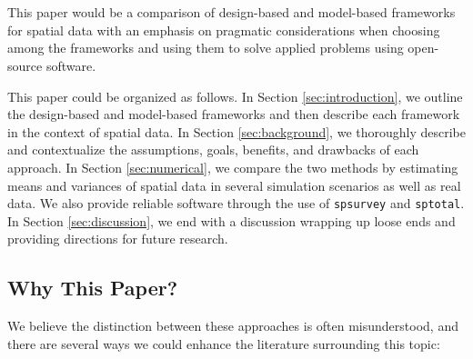 




\maketitle

\linenumbers

\clearpage

% 

\clearpage

\section*{}

This paper would be a comparison of design-based and model-based frameworks for spatial data with an emphasis on pragmatic considerations when choosing among the frameworks and using them to solve applied problems using open-source software.

This paper could be organized as follows. In Section \ref{sec:introduction}, we outline the design-based and model-based frameworks and then describe each framework in the context of spatial data. In Section \ref{sec:background}, we thoroughly describe and contextualize the assumptions, goals, benefits, and drawbacks of each approach. In Section \ref{sec:numerical}, we compare the two methods by estimating means and variances of spatial data in several simulation scenarios as well as real data. We also provide reliable software through the use of \texttt{spsurvey} and \texttt{sptotal}. In Section \ref{sec:discussion}, we end with a discussion wrapping up loose ends and providing directions for future research.

\subsection*{Why This Paper?}

We believe the distinction between these approaches is often misunderstood, and there are several ways we could enhance the literature surrounding this topic:

